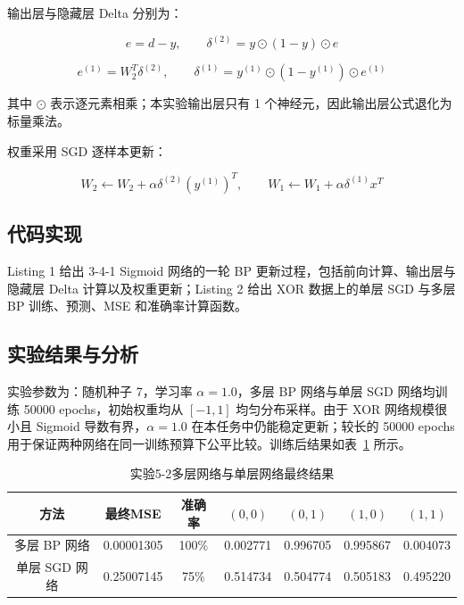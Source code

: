 \documentclass[10.5pt]{config}
\begin{document}
输出层与隐藏层 Delta 分别为：

\[
e=d-y,\qquad \delta^{(2)}=y\odot(1-y)\odot e
\]

\[
e^{(1)}=W_2^T\delta^{(2)},\qquad
\delta^{(1)}=y^{(1)}\odot(1-y^{(1)})\odot e^{(1)}
\]

其中 $\odot$ 表示逐元素相乘；本实验输出层只有 1 个神经元，因此输出层公式退化为标量乘法。

权重采用 SGD 逐样本更新：

\[
W_2\leftarrow W_2+\alpha\delta^{(2)}(y^{(1)})^T,\qquad
W_1\leftarrow W_1+\alpha\delta^{(1)}x^T
\]

\subsection{代码实现}

Listing 1 给出 3-4-1 Sigmoid 网络的一轮 BP 更新过程，包括前向计算、输出层与隐藏层 Delta 计算以及权重更新；Listing 2 给出 XOR 数据上的单层 SGD 与多层 BP 训练、预测、MSE 和准确率计算函数。





\subsection{实验结果与分析}

实验参数为：随机种子 7，学习率 $\alpha=1.0$，多层 BP 网络与单层 SGD 网络均训练 50000 epochs，初始权重均从 $[-1,1]$ 均匀分布采样。由于 XOR 网络规模很小且 Sigmoid 导数有界，$\alpha=1.0$ 在本任务中仍能稳定更新；较长的 50000 epochs 用于保证两种网络在同一训练预算下公平比较。训练后结果如表~\ref{tab:exp52_results} 所示。

\begin{table}[H]
\centering
\small
\begin{tabular}{ccccccc}
\toprule
方法 & 最终MSE & 准确率 & $(0,0)$ & $(0,1)$ & $(1,0)$ & $(1,1)$ \\
\midrule
多层 BP 网络 & 0.00001305 & 100\% & 0.002771 & 0.996705 & 0.995867 & 0.004073 \\
单层 SGD 网络 & 0.25007145 & 75\% & 0.514734 & 0.504774 & 0.505183 & 0.495220 \\
\bottomrule
\end{tabular}
\caption{实验5-2多层网络与单层网络最终结果}
\label{tab:exp52_results}
\end{table}
\end{document}
